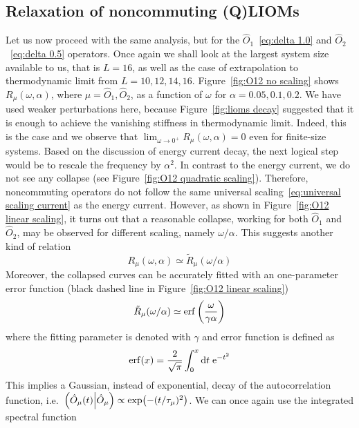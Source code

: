 \subsection{Relaxation of noncommuting (Q)LIOMs}
Let us now proceed with the same analysis, but for the \(\hat{O}_1\)~\eqref{eq:delta 1.0} 
and \(\hat{O}_2\)~\eqref{eq:delta 0.5} operators. Once again we shall look at the largest
system size available to us, that is \(L = 16\), as well as the case of extrapolation
to thermodynamic limit from \(L = 10,12,14,16\). 
Figure~\ref{fig:O12 no scaling} shows
\(R_{\mu}(\omega,\alpha)\), where \(\mu=\hat{O}_1,\hat{O}_2\), as a function of \(\omega\) for \(\alpha = 0.05,0.1,0.2\).
We have used weaker perturbations here, because Figure~\ref{fig:lioms decay} suggested that
it is enough to achieve the vanishing stiffness in thermodynamic limit. Indeed, this is the case
and we observe that \(\lim_{{\omega\to 0^{+}}} R_{\mu}(\omega,\alpha) = 0\) even for finite-size systems.
Based on the discussion of energy current decay, the next logical step would be to rescale the
frequency by \(\alpha^2\).
In contrast to the energy current, we do not see any collapse (see Figure~\ref{fig:O12 quadratic scaling}).
Therefore, noncommuting operators do not follow the same universal scaling~\eqref{eq:universal scaling current}
as the energy current. However, as shown in Figure~\ref{fig:O12 linear scaling},
it turns out that a reasonable collapse, working for both \(\hat{O}_1\) and \(\hat{O}_2\),
may be observed for different scaling, namely \(\omega/\alpha\). This suggests another kind
of relation
\begin{equation}
  R_{\mu}(\omega,\alpha) \simeq \tilde{R}_{\mu}(\omega/\alpha)
\end{equation}
Moreover, the collapsed curves can be accurately fitted with an one-parameter error function
 (black dashed line in Figure~\ref{fig:O12 linear scaling})
\begin{equation}
  \tilde{R}_{\mu}(\omega/\alpha) \simeq \erf\left(\frac{\omega}{\gamma \alpha}\right)
  \label{eq:erf fit}
\end{equation}
where the fitting parameter is denoted with \(\gamma\) and error function is defined as
\begin{equation}
\erf(x) = \frac{2}{\sqrt{\pi}} \int_{0}^{x} \mathrm{d}t\; \mathrm{e}^{-t^2}  
\end{equation}
This implies a Gaussian, instead of
exponential, decay of the autocorrelation function, i.e.\ \(\left(\hat{O}_{\mu}(t) \middle| \hat{O}_{\mu}\right)
\propto \exp(-(t/\tau_{\mu})^2)\). We can once again use the integrated spectral function
